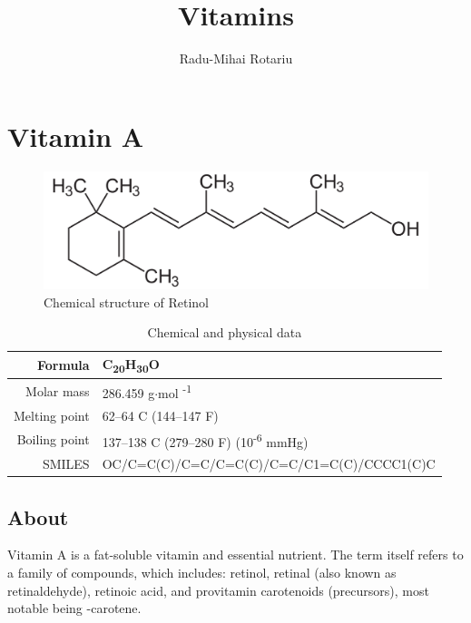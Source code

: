 \documentclass{book}
\begin{document}
\title{Vitamins}
\author{Radu-Mihai Rotariu}
\maketitle
{}
\tableofcontents\newpage
{}

\chapter{Vitamin A}
\begin{figure}[h]
	\caption{Chemical structure of Retinol}
	\centering \includegraphics[width=\textwidth]{images/Vitamin_A_chemical_structure}
\end{figure}

\begin{table}[h]
	\caption{Chemical and physical data}
	\centering \begin{tabular}{| r | l |}
		\hline
		Formula & C\textsubscript{20}H\textsubscript{30}O\\ \hline
		Molar mass & 286.459 g$\cdot$mol \textsuperscript{-1}\\ \hline
		Melting point & 62--64 \degree C (144--147 \degree F)\\ \hline
		Boiling point & 137--138 \degree C (279--280 \degree F) (10\textsuperscript{-6} mmHg)\\ \hline
		SMILES & OC/C=C(C)/C=C/C=C(C)/C=C/C1=C(C)/CCCC1(C)C\\ \hline
	\end{tabular}
\end{table}
\newpage

\section{About}
Vitamin A is a fat-soluble vitamin and essential nutrient. The term itself refers to a family of compounds, which includes: retinol, retinal (also known as retinaldehyde), retinoic acid, and provitamin carotenoids (precursors), most notable being \textbeta-carotene.
\end{document}
